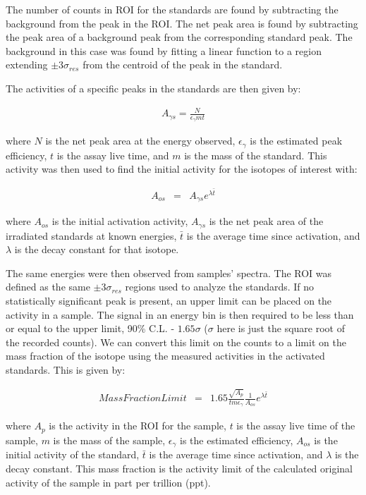 The number of counts in ROI for the standards are found by subtracting the background from the peak in the ROI.  The net peak area is found by subtracting the peak area of a background peak from the corresponding standard peak.  The background in this case was found by fitting a linear function to a region extending $\pm$3$\sigma_{res}$ from the centroid of the peak in the standard.  

The activities of a specific peaks in the standards are then given by:

\begin{eqnarray}
A_{\gamma s} = \frac{N}{\epsilon_\gamma m t}
\end{eqnarray}

\noindent where $N$ is the net peak area at the energy observed, $\epsilon_\gamma$ is the estimated peak efficiency, $t$ is the assay live time, and $m$ is the mass of the standard.  This activity was then used to find the initial activity for the isotopes of interest with:

\begin{eqnarray}
A_{os} &=&A_{\gamma s}e^{\lambda \bar{t}}
\end{eqnarray}

\noindent where $A_{os}$ is the initial activation activity, $A_{\gamma s}$ is the net peak area of the irradiated standards at known energies, $\bar{t}$ is the average time since activation, and $\lambda$ is the decay constant for that isotope.  

The same energies were then observed from samples' spectra.  The ROI was defined as the same $\pm$3$\sigma_{res}$ regions used to analyze the standards.  If no statistically significant peak is present, an upper limit can be placed on the activity in a sample.  The signal in an energy bin is then required to be less than or equal to the upper limit, 90\% C.L. - $1.65\sigma$ ($\sigma$ here is just the square root of the recorded counts).  We can convert this limit on the counts to a limit on the mass fraction of the isotope using the measured activities in the activated standards.  This is given by:

\begin{eqnarray}
Mass Fraction Limit&=&1.65 \frac{\sqrt{A_p}}{t  m  \epsilon_\gamma} \frac{1}{A_{os}} e^{\lambda \bar{t}}
\end{eqnarray}

where $A_p$ is the activity in the ROI for the sample, $t$ is the assay live time of the sample, $m$ is the mass of the sample, $\epsilon_\gamma$ is the estimated efficiency, $A_{os}$ is the initial activity of the standard, $\bar{t}$ is the average time since activation, and $\lambda$ is the decay constant.  This mass fraction is the activity limit of the calculated original activity of the sample in part per trillion (ppt).



